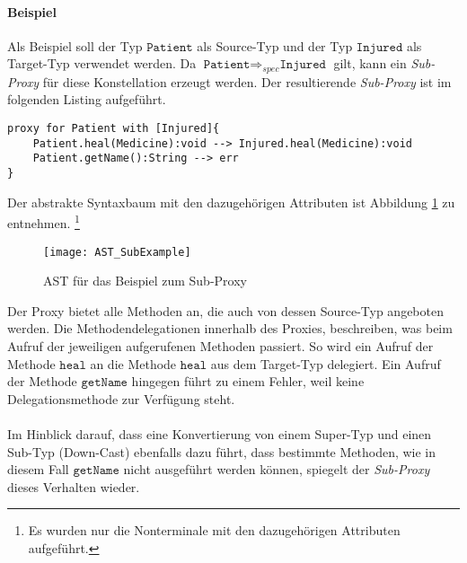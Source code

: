 \paragraph{Beispiel}
Als Beispiel soll  der Typ $\texttt{Patient}$ als Source-Typ und der Typ $\texttt{Injured}$ als Target-Typ verwendet werden. Da $\texttt{Patient} \Rightarrow_{spec} \texttt{Injured}$ gilt, kann ein \emph{Sub-Proxy} für diese Konstellation erzeugt werden. Der resultierende \emph{Sub-Proxy} ist im folgenden Listing aufgeführt.
\begin{lstlisting}[style = dsl, caption = Sub-Proxy für Patient, captionpos = b]
proxy for Patient with [Injured]{
	Patient.heal(Medicine):void --> Injured.heal(Medicine):void
	Patient.getName():String --> err
}
\end{lstlisting}
Der abstrakte Syntaxbaum mit den dazugehörigen Attributen ist Abbildung \ref{fig:ASTSUB} zu entnehmen. \footnote{Es wurden nur die Nonterminale mit den dazugehörigen Attributen aufgeführt.}
\begin{figure}[h!]
\texttt{[image: AST\_SubExample]}
\caption{AST für das Beispiel zum Sub-Proxy}
\label{fig:ASTSUB}
\end{figure}
\noindent
Der Proxy bietet alle Methoden an, die auch von dessen Source-Typ angeboten werden. Die Methodendelegationen innerhalb des Proxies, beschreiben, was beim Aufruf der jeweiligen aufgerufenen Methoden passiert. So wird ein Aufruf der Methode $\texttt{heal}$ an die Methode $\texttt{heal}$ aus dem Target-Typ delegiert. Ein Aufruf der Methode $\texttt{getName}$ hingegen führt zu einem Fehler, weil keine Delegationsmethode zur Verfügung steht.\\\\
Im Hinblick darauf, dass eine Konvertierung von einem Super-Typ und einen Sub-Typ (Down-Cast) ebenfalls dazu führt, dass bestimmte Methoden, wie in diesem Fall $\texttt{getName}$ nicht ausgeführt werden können, spiegelt der \emph{Sub-Proxy} dieses Verhalten wieder.
